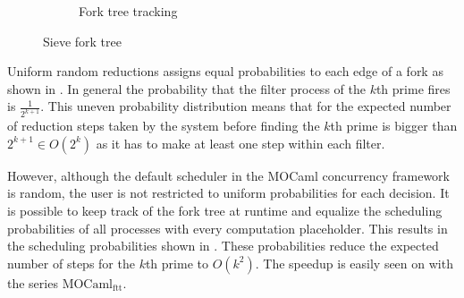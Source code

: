 \documentclass[12pt,twoside,notitlepage]{report}
\theoremstyle{plain}%
\theoremstyle{definition}
\theoremstyle{remark}
\begin{document}
\begin{figure}[H]
\begin{subfigure}[b]{0.45\linewidth}
\caption{Fork tree tracking}
\label{fig:sieve_ftt}
\end{subfigure}
%

%
%

%
\caption{Sieve fork tree}
\label{fig:sieve_fork_tree}
\end{figure}


Uniform random reductions assigns equal probabilities to each edge of a fork as shown in . In general the probability that the filter process of the $ k $th prime fires is $ \frac{1}{2^{k+1}} $. This uneven probability distribution means that for the expected number of reduction steps taken by the system before finding the $ k $th prime is bigger than $ 2^{k+1} \in O(2^{k}) $ as it has to make at least one step within each filter.

However, although the default scheduler in the MOCaml concurrency framework is random, the user is not restricted to uniform probabilities for each decision. It is possible to keep track of the fork tree at runtime and equalize the scheduling probabilities of all processes with every computation placeholder. This results in the scheduling probabilities shown in . These probabilities reduce the expected number of steps for the $ k $th prime to $ O(k^2) $. The speedup is easily seen on  with the series $ \text{MOCaml}_{\text{ftt}} $.
\end{document}
